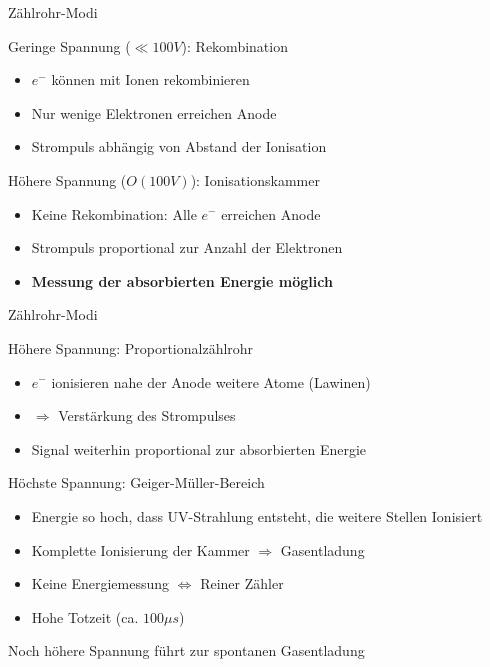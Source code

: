 \begin{frame}{Zählrohr-Modi}
	\begin{block}{Geringe Spannung ($\ll 100V$): Rekombination}
		\begin{itemize}
		  	\item $e^-$ können mit Ionen rekombinieren
		  	\item Nur wenige Elektronen erreichen Anode
		  	\item Strompuls abhängig von Abstand der Ionisation
		\end{itemize}
	\end{block}
	
	\begin{block}{Höhere Spannung ($O(100V)$): Ionisationskammer}
		\begin{itemize}
		  	\item Keine Rekombination: Alle $e^-$ erreichen Anode
		  	\item Strompuls proportional zur Anzahl der Elektronen
			\item \textbf{Messung der absorbierten Energie möglich}
		\end{itemize}
	\end{block}
	
\end{frame}

\begin{frame}{Zählrohr-Modi}
	\begin{block}{Höhere Spannung: Proportionalzählrohr}
		\begin{itemize}
		  	\item $e^-$ ionisieren nahe der Anode weitere Atome (Lawinen)
			\item $\Rightarrow$ Verstärkung des Strompulses
		  	\item Signal weiterhin proportional zur absorbierten Energie
		\end{itemize}
	\end{block}
	
	\begin{block}{Höchste Spannung: Geiger-Müller-Bereich}
		\begin{itemize}
	  		\item Energie so hoch, dass UV-Strahlung entsteht, die weitere Stellen
	  		Ionisiert
	  		\item Komplette Ionisierung der Kammer $\Rightarrow$ Gasentladung
	  		\item Keine Energiemessung $\Leftrightarrow$ Reiner Zähler
	  		\item Hohe Totzeit (ca. $100\mu s$)
		\end{itemize}
	\end{block}
	Noch höhere Spannung führt zur spontanen Gasentladung
\end{frame}
